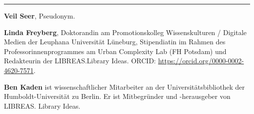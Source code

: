 \begin{center}\rule{0.5\linewidth}{\linethickness}\end{center}

\textbf{Veil Seer}, Pseudonym.

\textbf{Linda Freyberg}, Doktorandin am Promotionskolleg Wissenskulturen
/ Digitale Medien der Leuphana Universität Lüneburg, Stipendiatin im
Rahmen des Professorinnenprogrammes am Urban Complexity Lab (FH Potsdam)
und Redakteurin der LIBREAS.Library Ideas. ORCID:
\url{https://orcid.org/0000-0002-4620-7571}.

\textbf{Ben Kaden} ist wissenschaftlicher Mitarbeiter an der
Universitätsbibliothek der Hum\-boldt-Uni\-ver\-si\-tät zu Berlin. Er ist
Mitbegründer und -herausgeber von LIBREAS. Library Ideas.

